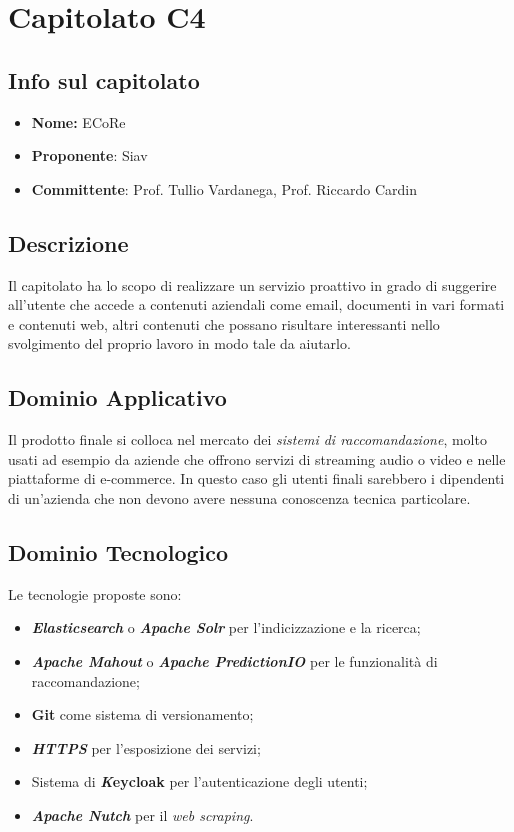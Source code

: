 
\section{Capitolato C4}
\subsection{Info sul capitolato}
\begin{itemize}
	\item \textbf{Nome:} ECoRe
	\item \textbf{Proponente}: Siav
	\item \textbf{Committente}: Prof. Tullio Vardanega, Prof. Riccardo Cardin
\end{itemize}

\subsection{Descrizione}
Il capitolato ha lo scopo di realizzare un servizio proattivo in grado di suggerire all'utente che accede a contenuti aziendali come email, documenti in vari formati e contenuti web, altri contenuti che possano risultare interessanti nello svolgimento del proprio lavoro in modo tale da aiutarlo. 

\subsection{Dominio Applicativo}
Il prodotto finale si colloca nel mercato dei \textit{sistemi di raccomandazione}, molto usati ad esempio da aziende che offrono servizi di streaming audio o video e nelle piattaforme di e-commerce. In questo caso gli utenti finali sarebbero i dipendenti di un'azienda che non devono avere nessuna conoscenza tecnica particolare. 

\subsection{Dominio Tecnologico}
Le tecnologie proposte sono:
\begin{itemize}
	\item \textit{\textbf{Elasticsearch}} o \textbf{\textit{Apache Solr}} per l'indicizzazione e la ricerca;
	\item \textbf{\textit{Apache Mahout}} o \textbf{\textit{Apache PredictionIO}} per le funzionalità di raccomandazione;
	\item \textbf{Git} come sistema di versionamento;
	\item \textbf{\textit{HTTPS}} per l'esposizione dei servizi;
	\item Sistema di \textbf{\textit Keycloak} per l'autenticazione degli utenti;
	\item \textbf{\textit{Apache Nutch}} per il \textit{web scraping}.
\end{itemize}

